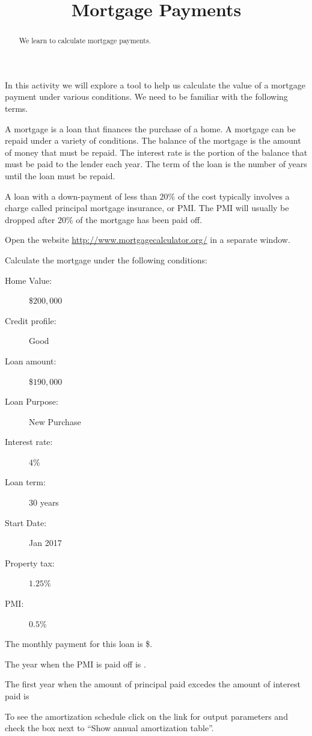 \documentclass{ximera}
\title{Mortgage Payments}
\begin{document}
\begin{abstract}
We learn to calculate mortgage payments.
\end{abstract}
\maketitle

In this activity we will explore a tool to help us calculate the value of a mortgage payment under various conditions. We need to be familiar with the following terms.  

A mortgage is a loan that finances the purchase of a home. A mortgage can be repaid under a variety of conditions. The balance of the mortgage is the amount of money that must be repaid. The interest rate is the portion of the balance that must be paid to the lender each year. The term of the loan is the number of years until the loan must be repaid.

A loan with a down-payment of less than $20\%$ of the cost typically involves a charge called principal mortgage insurance, or PMI. The PMI will usually be dropped after $20\%$ of the mortgage has been paid off.

Open the website \url{http://www.mortgagecalculator.org/} in a separate window. 

\begin{question}
Calculate the mortgage under the following conditions:
\begin{description}
\item[Home Value:] \$$200,000$
\item[Credit profile:] Good
\item[Loan amount:] \$$190,000$
\item[Loan Purpose:] New Purchase
\item[Interest rate:] $4$\%
\item[Loan term:] $30$ years
\item[Start Date:] Jan 2017
\item[Property tax:] $1.25$\%
\item[PMI:] $0.5$\%
\end{description}

The monthly payment for this loan is \$.

The year when the PMI is paid off is .

The first year when the amount of principal paid excedes the amount of interest paid is 

\begin{hint}
To see the amortization schedule click on the link for output parameters and check the box next to ``Show annual amortization table''.
\end{hint}
\end{question}
\end{document}

